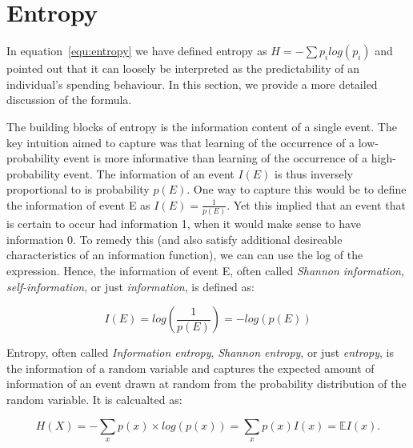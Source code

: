 \section{Entropy}%
\label{sec:entropy}

In equation~\ref{equ:entropy} we have defined entropy as $H =
-\sum{p_i}log(p_i)$ and pointed out that it can loosely be interpreted as the predictability of an
individual's spending behaviour. In this section, we provide a more detailed
discussion of the formula.

The building blocks of entropy is the information content of a single event.
The key intuition \citet{shannon1948mathematical} aimed to capture was that
learning of the occurrence of a low-probability event is more informative than
learning of the occurrence of a high-probability event. The information of an
event $I(E)$ is thus inversely proportional to is probability $p(E)$. One way
to capture this would be to define the information of event E as $I(E) =
\frac{1}{p(E)}$. Yet this implied that an event that is certain to occur had
information 1, when it would make sense to have information 0. To remedy this
(and also satisfy additional desireable characteristics of an information
function), we can can use the log of the expression. Hence, the information of
event E, often called \textit{Shannon information}, \textit{self-information},
or just \textit{information}, is defined as:

\begin{equation}
    I(E) = log\left(\frac{1}{p(E)}\right) = -log(p(E))
\end{equation}

Entropy, often called \textit{Information entropy}, \textit{Shannon entropy},
or just \textit{entropy}, is the information of a random variable and captures
the expected amount of information of an event drawn at random from the
probability distribution of the random variable. It is calcualted as:

\begin{equation}
    H(X) = -\sum_x p(x) \times log(p(x)) = \sum_x p(x)I(x) = \mathbb{E} I(x).
\end{equation}


